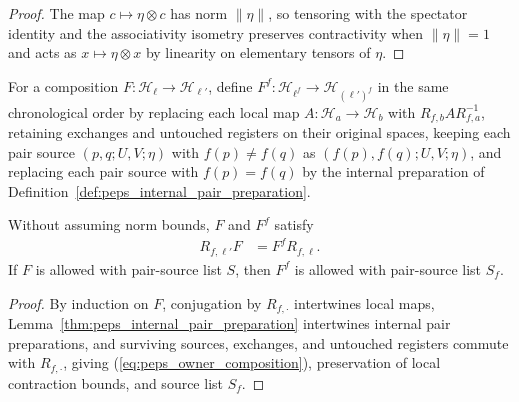 \begin{proof}\leanok
    The map $c\mapsto\eta\otimes c$ has norm $\|\eta\|$, so tensoring with the
    spectator identity and the associativity isometry preserves contractivity
    when $\|\eta\|=1$ and acts as $x\mapsto\eta\otimes x$ by linearity on
    elementary tensors of $\eta$.
\end{proof}

\begin{definition}
    \label{def:peps_owner_composition}
    \leanok
    For a composition $F:\mathcal H_\ell\to\mathcal H_{\ell'}$, define
    $F^f:\mathcal H_{\ell^f}\to\mathcal H_{(\ell')^f}$ in the same
    chronological order by replacing each local map $A:\mathcal H_a\to\mathcal H_b$
    with $R_{f,b}AR_{f,a}^{-1}$, retaining exchanges and untouched registers on
    their original spaces, keeping each pair source $(p,q;U,V;\eta)$ with
    $f(p)\ne f(q)$ as $(f(p),f(q);U,V;\eta)$, and replacing each pair source
    with $f(p)=f(q)$ by the internal preparation of
    Definition~\ref{def:peps_internal_pair_preparation}.
\end{definition}

\begin{lemma}
    \label{thm:peps_owner_composition}
    \leanok
    Without assuming norm bounds, $F$ and $F^f$ satisfy
    \begin{align}
        R_{f,\ell'}F & =F^fR_{f,\ell}.
        \label{eq:peps_owner_composition}
    \end{align}
    If $F$ is allowed with pair-source list $S$, then $F^f$ is allowed with
    pair-source list $S_f$.
\end{lemma}

\begin{proof}\leanok
    By induction on $F$, conjugation by $R_{f,\cdot}$ intertwines
    local maps, Lemma~\ref{thm:peps_internal_pair_preparation} intertwines
    internal pair preparations, and surviving sources, exchanges, and untouched
    registers commute with $R_{f,\cdot}$, giving (\ref{eq:peps_owner_composition}),
    preservation of local contraction bounds, and source list $S_f$.
\end{proof}

